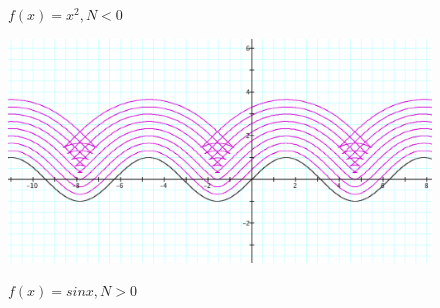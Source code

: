 \begin{figure}[H]
\begin{minipage}[b]{\w}
    \caption{$ f(x) = x ^ 2, N < 0 $}
    \vspace{4ex}
  \end{minipage} %
\end{figure}

\renewcommand\w{.80\textwidth}

\begin{figure}[H]
  \label{example-2}
  \centering
  \begin{minipage}[b]{\w}
    \centering
    \label{example:3}
    \includegraphics[width=\fw]{img/03-some-examples/03.png}
    \caption{$ f(x) = sin x, N > 0 $}
    \vspace{4ex}
  \end{minipage} %
\end{figure}

\renewcommand\w{.40\textwidth}

